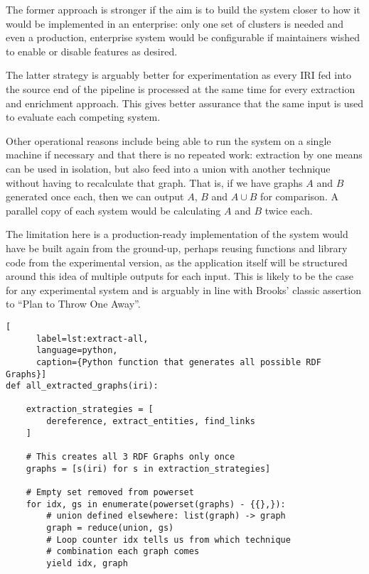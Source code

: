 The former approach is stronger if the aim is to build the system
closer to how it would be implemented in an enterprise: only one
set of clusters is needed and even a production, enterprise system
would be configurable if maintainers wished to enable or disable
features as desired.

The latter strategy is arguably better for experimentation as every
IRI fed into the source end of the pipeline is processed at the same
time for every extraction and enrichment approach. This gives better
assurance that the same input is used to evaluate each competing
system.

Other operational reasons include being able to run the system on a
single machine if necessary and that there is no repeated work:
extraction by one means can be used in isolation, but also feed into
a union with another technique without having to recalculate that
graph. That is, if we have graphs $A$ and $B$ generated once each,
then we can output $A$, $B$ and $A \cup B$ for comparison. A parallel copy
of each system would be calculating $A$ and $B$ twice each.

The limitation here is a production-ready implementation of the
system would have be built again from the ground-up, perhaps reusing
functions and library code from the experimental version, as the
application itself will be structured around this idea of multiple
outputs for each input. This is likely to be the case for any
experimental system and is arguably in line with Brooks' classic
assertion to ``Plan to Throw One Away''\cite{brooks1995mythical}.

\begin{centering}
  \begin{lstlisting}[
      label=lst:extract-all,
      language=python,
      caption={Python function that generates all possible RDF Graphs}]
def all_extracted_graphs(iri):
    
    extraction_strategies = [
        dereference, extract_entities, find_links
    ]

    # This creates all 3 RDF Graphs only once
    graphs = [s(iri) for s in extraction_strategies]

    # Empty set removed from powerset
    for idx, gs in enumerate(powerset(graphs) - {{},}):
        # union defined elsewhere: list(graph) -> graph
        graph = reduce(union, gs)
        # Loop counter idx tells us from which technique
        # combination each graph comes
        yield idx, graph
  \end{lstlisting}
\end{centering}

